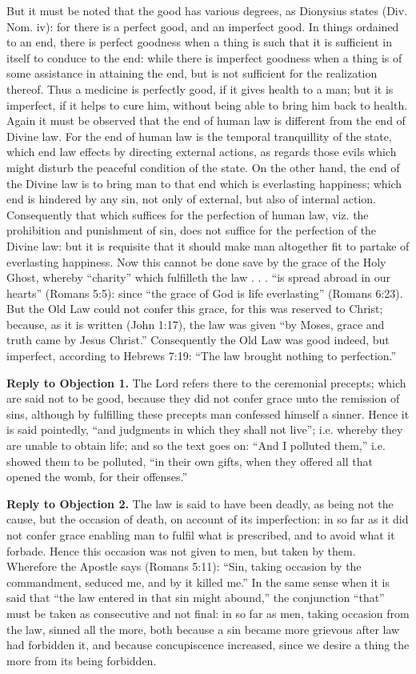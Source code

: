 But it must be noted that the good has various degrees, as Dionysius states (Div. Nom. iv): for there is a perfect good, and an imperfect good. In things ordained to an end, there is perfect goodness when a thing is such that it is sufficient in itself to conduce to the end: while there is imperfect goodness when a thing is of some assistance in attaining the end, but is not sufficient for the realization thereof. Thus a medicine is perfectly good, if it gives health to a man; but it is imperfect, if it helps to cure him, without being able to bring him back to health. Again it must be observed that the end of human law is different from the end of Divine law. For the end of human law is the temporal tranquillity of the state, which end law effects by directing external actions, as regards those evils which might disturb the peaceful condition of the state. On the other hand, the end of the Divine law is to bring man to that end which is everlasting happiness; which end is hindered by any sin, not only of external, but also of internal action. Consequently that which suffices for the perfection of human law, viz. the prohibition and punishment of sin, does not suffice for the perfection of the Divine law: but it is requisite that it should make man altogether fit to partake of everlasting happiness. Now this cannot be done save by the grace of the Holy Ghost, whereby ``charity'' which fulfilleth the law . . . ``is spread abroad in our hearts'' (Romans 5:5): since ``the grace of God is life everlasting'' (Romans 6:23). But the Old Law could not confer this grace, for this was reserved to Christ; because, as it is written (John 1:17), the law was given ``by Moses, grace and truth came by Jesus Christ.'' Consequently the Old Law was good indeed, but imperfect, according to Hebrews 7:19: ``The law brought nothing to perfection.''

\textbf{Reply to Objection 1.} The Lord refers there to the ceremonial precepts; which are said not to be good, because they did not confer grace unto the remission of sins, although by fulfilling these precepts man confessed himself a sinner. Hence it is said pointedly, ``and judgments in which they shall not live''; i.e. whereby they are unable to obtain life; and so the text goes on: ``And I polluted them,'' i.e. showed them to be polluted, ``in their own gifts, when they offered all that opened the womb, for their offenses.''

\textbf{Reply to Objection 2.} The law is said to have been deadly, as being not the cause, but the occasion of death, on account of its imperfection: in so far as it did not confer grace enabling man to fulfil what is prescribed, and to avoid what it forbade. Hence this occasion was not given to men, but taken by them. Wherefore the Apostle says (Romans 5:11): ``Sin, taking occasion by the commandment, seduced me, and by it killed me.'' In the same sense when it is said that ``the law entered in that sin might abound,'' the conjunction ``that'' must be taken as consecutive and not final: in so far as men, taking occasion from the law, sinned all the more, both because a sin became more grievous after law had forbidden it, and because concupiscence increased, since we desire a thing the more from its being forbidden.

